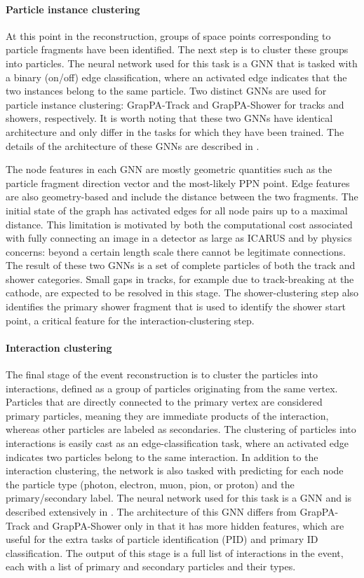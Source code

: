 \paragraph{Particle instance clustering}
At this point in the reconstruction, groups of space points corresponding to particle fragments have been identified. The next step is to cluster these groups into particles. The neural network used for this task is a GNN that is tasked with a binary (on/off) edge classification, where an activated edge indicates that the two instances belong to the same particle. Two distinct GNNs are used for particle instance clustering: GrapPA-Track and GrapPA-Shower for tracks and showers, respectively. It is worth noting that these two GNNs have identical architecture and only differ in the tasks for which they have been trained. The details of the architecture of these GNNs are described in \cite{Drielsma2021}.

The node features in each GNN are mostly geometric quantities such as the particle fragment direction vector and the most-likely PPN point. Edge features are also geometry-based and include the distance between the two fragments. The initial state of the graph has activated edges for all node pairs up to a maximal distance. This limitation is motivated by both the computational cost associated with fully connecting an image in a detector as large as ICARUS and by physics concerns: beyond a certain length scale there cannot be legitimate connections. The result of these two GNNs is a set of complete particles of both the track and shower categories. Small gaps in tracks, for example due to track-breaking at the cathode, are expected to be resolved in this stage. The shower-clustering step also identifies the primary shower fragment that is used to identify the shower start point, a critical feature for the interaction-clustering step.

\paragraph{Interaction clustering}
The final stage of the event reconstruction is to cluster the particles into interactions, defined as a group of particles originating from the same vertex. Particles that are directly connected to the primary vertex are considered primary particles, meaning they are immediate products of the interaction, whereas other particles are labeled as secondaries. The clustering of particles into interactions is easily cast as an edge-classification task, where an activated edge indicates two particles belong to the same interaction. In addition to the interaction clustering, the network is also tasked with predicting for each node the particle type (photon, electron, muon, pion, or proton) and the primary/secondary label. The neural network used for this task is a GNN and is described extensively in \cite{Drielsma2021}. The architecture of this GNN differs from GrapPA-Track and GrapPA-Shower only in that it has more hidden features, which are useful for the extra tasks of particle identification (PID) and primary ID classification. The output of this stage is a full list of interactions in the event, each with a list of primary and secondary particles and their types.

